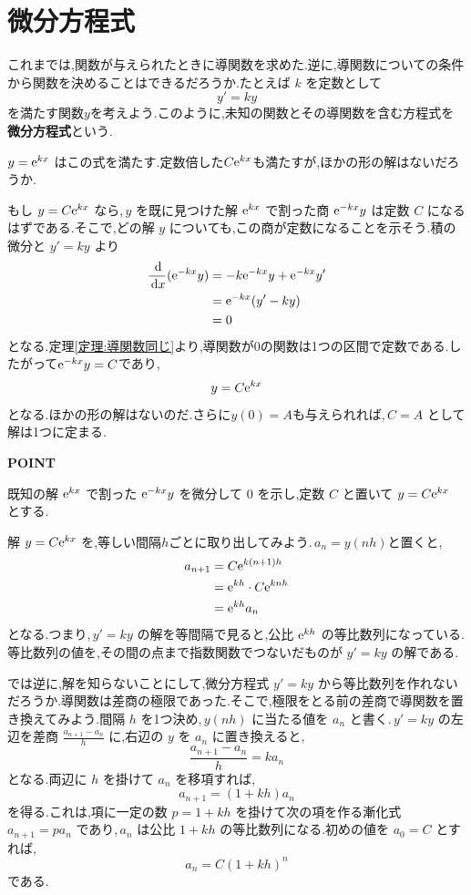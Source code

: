 \section{微分方程式}\label{節:微分方程式}
これまでは,関数が与えられたときに導関数を求めた.逆に,導関数についての条件から関数を決めることはできるだろうか.たとえば $k$ を定数として
\[
 y'=ky
\]
を満たす関数$y$を考えよう.このように,未知の関数とその導関数を含む方程式を\textbf{微分方程式}という.

$y=\mathrm{e}^{kx}$ はこの式を満たす.定数倍した$C\mathrm{e}^{kx}$も満たすが,ほかの形の解はないだろうか.

もし $y=C\mathrm{e}^{kx}$ なら,\,$y$ を既に見つけた解 $\mathrm{e}^{kx}$ で割った商 $\mathrm{e}^{-kx}y$ は定数 $C$ になるはずである.そこで,どの解 $y$ についても,この商が定数になることを示そう.積の微分と $y'=ky$ より
\begin{align*}
 \frac{\,\mathrm{d}}{\,\mathrm{d} x}(\mathrm{e}^{-kx}y)
 &=-k\mathrm{e}^{-kx}y+\mathrm{e}^{-kx}y'\\
 &=\mathrm{e}^{-kx}(y'-ky)\\
 &=0
\end{align*}
となる.定理\ref{定理:導関数同じ}より,導関数が$0$の関数は1つの区間で定数である.したがって$\mathrm{e}^{-kx}y=C$であり,
\[
 y=C\mathrm{e}^{kx}
\]
となる.ほかの形の解はないのだ.さらに$y(0)=A$も与えられれば,\,$C=A$ として解は1つに定まる.

\begin{bookpoint}
\textbf{POINT}\par
既知の解 $\mathrm{e}^{kx}$ で割った $\mathrm{e}^{-kx}y$ を微分して $0$ を示し,定数 $C$ と置いて $y=C\mathrm{e}^{kx}$ とする.
\end{bookpoint}

解 $y=C\mathrm{e}^{kx}$ を,等しい間隔$h$ごとに取り出してみよう.\,$a_n=y(nh)$と置くと,
\begin{align*}
 a_{n+1}&=C\mathrm{e}^{k(n+1)h}\\
 &=\mathrm{e}^{kh}\cdot C\mathrm{e}^{knh}\\
 &=\mathrm{e}^{kh}a_n
\end{align*}
となる.つまり,\,$y'=ky$ の解を等間隔で見ると,公比 $\mathrm{e}^{kh}$ の等比数列になっている.等比数列の値を,その間の点まで指数関数でつないだものが $y'=ky$ の解である.

では逆に,解を知らないことにして,微分方程式 $y'=ky$ から等比数列を作れないだろうか.導関数は差商の極限であった.そこで,極限をとる前の差商で導関数を置き換えてみよう.間隔 $h$ を1つ決め,\,$y(nh)$ に当たる値を $a_n$ と書く.\,$y'=ky$ の左辺を差商 $\frac{a_{n+1}-a_n}{h}$ に,右辺の $y$ を $a_n$ に置き換えると,
\[
 \frac{a_{n+1}-a_n}{h}=ka_n
\]
となる.両辺に $h$ を掛けて $a_n$ を移項すれば,
\[
 a_{n+1}=(1+kh)a_n
\]
を得る.これは,項に一定の数 $p=1+kh$ を掛けて次の項を作る漸化式 $a_{n+1}=pa_n$ であり,\,$a_n$ は公比 $1+kh$ の等比数列になる.初めの値を $a_0=C$ とすれば,
\[
 a_n=C(1+kh)^n
\]
である.

